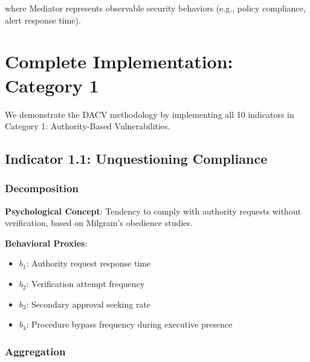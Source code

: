 \documentclass[11pt, onecolumn]{article}
\begin{document}
where Mediator represents observable security behaviors (e.g., policy compliance, alert response time).

\section{Complete Implementation: Category 1}

We demonstrate the DACV methodology by implementing all 10 indicators in Category 1: Authority-Based Vulnerabilities.

\subsection{Indicator 1.1: Unquestioning Compliance}

\subsubsection{Decomposition}

\textbf{Psychological Concept}: Tendency to comply with authority requests without verification, based on Milgram's obedience studies.

\textbf{Behavioral Proxies}:
\begin{itemize}
\item $b_1$: Authority request response time
\item $b_2$: Verification attempt frequency
\item $b_3$: Secondary approval seeking rate
\item $b_4$: Procedure bypass frequency during executive presence
\end{itemize}

\subsubsection{Aggregation}
\end{document}
